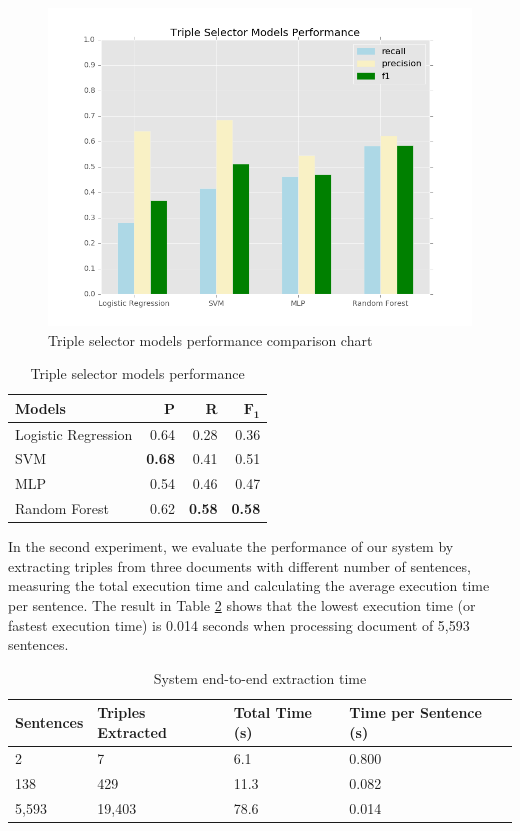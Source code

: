 \documentclass[peerreview,12pt]{IEEEtran}
\begin{document}
\begin{figure}
\includegraphics[scale=0.4]{models_performance}
\caption{Triple selector models performance comparison chart}
\label{fig_models_performance}
\end{figure}

\begin{table}[!t]
\renewcommand{\arraystretch}{1.5}
\caption{Triple selector models performance}
\label{table_models_performance}
\centering
\begin{tabular}{l r r r}
\hline
\textbf{Models} & \textbf{P} & \textbf{R} & $\mathbf{F_1}$ \\
\hline
Logistic Regression & 0.64 & 0.28 & 0.36 \\
SVM & \textbf{0.68} & 0.41 & 0.51 \\
MLP & 0.54 & 0.46 & 0.47 \\
Random Forest & 0.62 & \textbf{0.58} & \textbf{0.58} \\
\hline
\end{tabular}
\end{table}

In the second experiment, we evaluate the performance of our system by extracting triples from three documents with different number of sentences, measuring the total execution time and calculating the average execution time per sentence. The result in Table \ref{table_system_extraction_time} shows that the lowest execution time (or fastest execution time) is 0.014 seconds when processing document of 5,593 sentences.

\begin{table}[!t]
	\renewcommand{\arraystretch}{1.5}
	\caption{System end-to-end extraction time}
	\label{table_system_extraction_time}
	\centering
	\begin{tabular}{l p{1.2cm} p{1.2cm} p{1.2cm}}
		\hline
		\textbf{Sentences} & \textbf{Triples Extracted} & \textbf{Total Time (s)} & \textbf{Time per Sentence (s)} \\
		\hline
		2 & 7 & 6.1 & 0.800 \\
		138 & 429 & 11.3 & 0.082 \\
		5,593 & 19,403 & 78.6 & 0.014 \\
		\hline
	\end{tabular}
\end{table}
\end{document}
